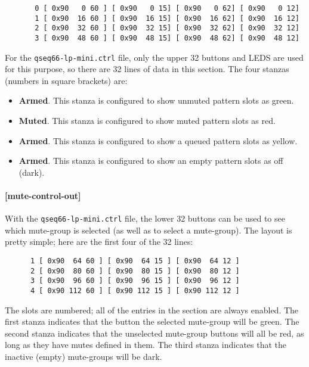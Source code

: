    \begin{verbatim}
       0 [ 0x90   0 60 ] [ 0x90   0 15] [ 0x90   0 62] [ 0x90   0 12]
       1 [ 0x90  16 60 ] [ 0x90  16 15] [ 0x90  16 62] [ 0x90  16 12]
       2 [ 0x90  32 60 ] [ 0x90  32 15] [ 0x90  32 62] [ 0x90  32 12]
       3 [ 0x90  48 60 ] [ 0x90  48 15] [ 0x90  48 62] [ 0x90  48 12]
   \end{verbatim}

   For the \texttt{qseq66-lp-mini.ctrl} file, only the upper 32 buttons and
   LEDS are used for this purpose, so there are 32 lines of data in this
   section.
   The four stanzas (numbers in square brackets) are:

   \begin{itemize}
      \item \textbf{Armed}.  This stanza is configured to show unmuted pattern
         slots as green.
      \item \textbf{Muted}.  This stanza is configured to show muted pattern
         slots as red.
      \item \textbf{Armed}.  This stanza is configured to show a queued pattern
         slots as yellow.
      \item \textbf{Armed}.  This stanza is configured to show an empty pattern
         slots as off (dark).
   \end{itemize}

\paragraph{[mute-control-out]}
\label{paragraph:patterns_mute_control_out}

   With the \texttt{qseq66-lp-mini.ctrl} file, the lower 32 buttons can be used
   to see which mute-group is selected (as well as to select a mute-group).
   The layout is pretty simple; here are the first four of the 32 lines:

   \begin{verbatim}
      1 [ 0x90  64 60 ] [ 0x90  64 15 ] [ 0x90  64 12 ]
      2 [ 0x90  80 60 ] [ 0x90  80 15 ] [ 0x90  80 12 ]
      3 [ 0x90  96 60 ] [ 0x90  96 15 ] [ 0x90  96 12 ]
      4 [ 0x90 112 60 ] [ 0x90 112 15 ] [ 0x90 112 12 ]
   \end{verbatim}

   The slots are numbered; all of the entries in the section are always
   enabled.  The first stanza indicates that the button the selected mute-group
   will be green.  The second stanza indicates that the unselected mute-group
   buttons will all be red, as long as they have mutes defined in them.  The
   third stanza indicates that the inactive (empty) mute-groups will be dark.

